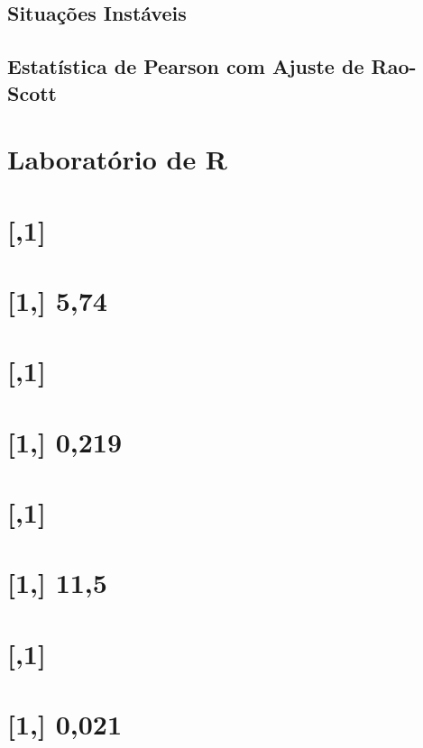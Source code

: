 \documentclass[]{book}
\theoremstyle{definition}
\theoremstyle{definition}
\theoremstyle{definition}
\theoremstyle{remark}
\begin{document}
\subsection{Situações Instáveis}\label{situacoes-instaveis}

\subsection{Estatística de Pearson com Ajuste de
Rao-Scott}\label{raoscott}

\section{Laboratório de R}\label{laboratorio-de-r-4}

\section{{[},1{]}}\label{section-30}

\section{{[}1,{]} 5,74}\label{section-31}

\section{{[},1{]}}\label{section-32}

\section{{[}1,{]} 0,219}\label{section-33}

\section{{[},1{]}}\label{section-34}

\section{{[}1,{]} 11,5}\label{section-35}

\section{{[},1{]}}\label{section-36}

\section{{[}1,{]} 0,021}\label{section-37}
\end{document}
